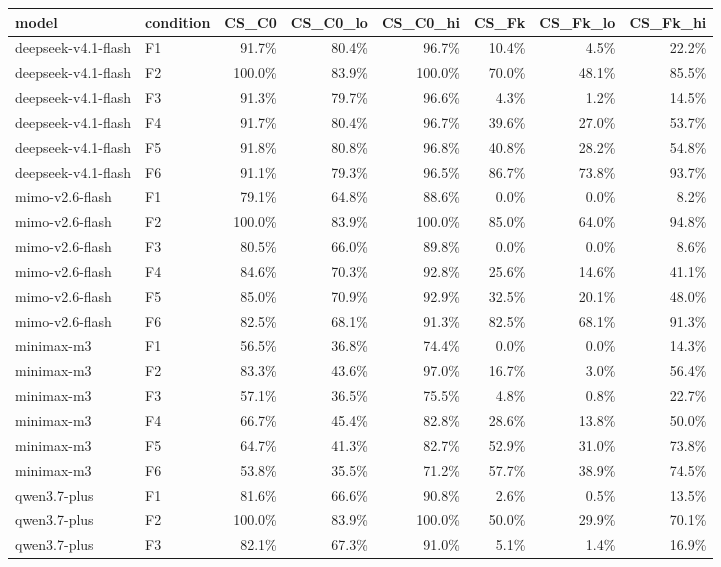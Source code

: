 \begin{tabular}{llrrrrrr}
\toprule
model & condition & CS\_C0 & CS\_C0\_lo & CS\_C0\_hi & CS\_Fk & CS\_Fk\_lo & CS\_Fk\_hi \\
\midrule
deepseek-v4.1-flash & F1 & 91.7\% & 80.4\% & 96.7\% & 10.4\% & 4.5\% & 22.2\% \\
deepseek-v4.1-flash & F2 & 100.0\% & 83.9\% & 100.0\% & 70.0\% & 48.1\% & 85.5\% \\
deepseek-v4.1-flash & F3 & 91.3\% & 79.7\% & 96.6\% & 4.3\% & 1.2\% & 14.5\% \\
deepseek-v4.1-flash & F4 & 91.7\% & 80.4\% & 96.7\% & 39.6\% & 27.0\% & 53.7\% \\
deepseek-v4.1-flash & F5 & 91.8\% & 80.8\% & 96.8\% & 40.8\% & 28.2\% & 54.8\% \\
deepseek-v4.1-flash & F6 & 91.1\% & 79.3\% & 96.5\% & 86.7\% & 73.8\% & 93.7\% \\
mimo-v2.6-flash & F1 & 79.1\% & 64.8\% & 88.6\% & 0.0\% & 0.0\% & 8.2\% \\
mimo-v2.6-flash & F2 & 100.0\% & 83.9\% & 100.0\% & 85.0\% & 64.0\% & 94.8\% \\
mimo-v2.6-flash & F3 & 80.5\% & 66.0\% & 89.8\% & 0.0\% & 0.0\% & 8.6\% \\
mimo-v2.6-flash & F4 & 84.6\% & 70.3\% & 92.8\% & 25.6\% & 14.6\% & 41.1\% \\
mimo-v2.6-flash & F5 & 85.0\% & 70.9\% & 92.9\% & 32.5\% & 20.1\% & 48.0\% \\
mimo-v2.6-flash & F6 & 82.5\% & 68.1\% & 91.3\% & 82.5\% & 68.1\% & 91.3\% \\
minimax-m3 & F1 & 56.5\% & 36.8\% & 74.4\% & 0.0\% & 0.0\% & 14.3\% \\
minimax-m3 & F2 & 83.3\% & 43.6\% & 97.0\% & 16.7\% & 3.0\% & 56.4\% \\
minimax-m3 & F3 & 57.1\% & 36.5\% & 75.5\% & 4.8\% & 0.8\% & 22.7\% \\
minimax-m3 & F4 & 66.7\% & 45.4\% & 82.8\% & 28.6\% & 13.8\% & 50.0\% \\
minimax-m3 & F5 & 64.7\% & 41.3\% & 82.7\% & 52.9\% & 31.0\% & 73.8\% \\
minimax-m3 & F6 & 53.8\% & 35.5\% & 71.2\% & 57.7\% & 38.9\% & 74.5\% \\
qwen3.7-plus & F1 & 81.6\% & 66.6\% & 90.8\% & 2.6\% & 0.5\% & 13.5\% \\
qwen3.7-plus & F2 & 100.0\% & 83.9\% & 100.0\% & 50.0\% & 29.9\% & 70.1\% \\
qwen3.7-plus & F3 & 82.1\% & 67.3\% & 91.0\% & 5.1\% & 1.4\% & 16.9\% \\

\end{tabular}
